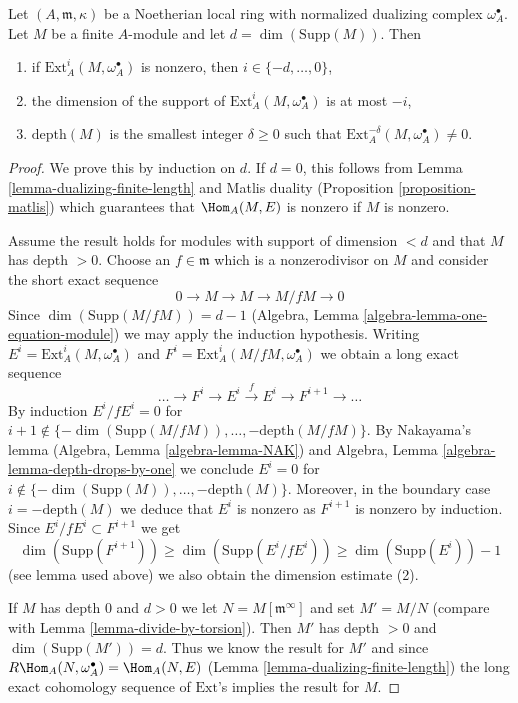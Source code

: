\begin{lemma}
\label{lemma-sitting-in-degrees}
Let $(A, \mathfrak m, \kappa)$ be a Noetherian local ring with
normalized dualizing complex $\omega_A^\bullet$. Let $M$ be a finite
$A$-module and let $d = \dim(\text{Supp}(M))$. Then
\begin{enumerate}
\item if $\text{Ext}^i_A(M, \omega_A^\bullet)$ is nonzero, then
$i \in \{-d, \ldots, 0\}$,
\item the dimension of the support of $\text{Ext}^i_A(M, \omega_A^\bullet)$
is at most $-i$,
\item $\text{depth}(M)$ is the smallest integer $\delta \geq 0$ such that
$\text{Ext}^{-\delta}_A(M, \omega_A^\bullet) \not = 0$.
\end{enumerate}
\end{lemma}

\begin{proof}
We prove this by induction on $d$. If $d = 0$, this follows from
Lemma \ref{lemma-dualizing-finite-length} and Matlis duality
(Proposition \ref{proposition-matlis}) which guarantees that
$\Hom_A(M, E)$ is nonzero if $M$ is nonzero.

\medskip\noindent
Assume the result holds for modules with support of dimension $< d$ and that
$M$ has depth $> 0$. Choose an $f \in \mathfrak m$ which is a nonzerodivisor
on $M$ and consider the short exact sequence
$$
0 \to M \to M \to M/fM \to 0
$$
Since $\dim(\text{Supp}(M/fM)) = d - 1$
(Algebra, Lemma \ref{algebra-lemma-one-equation-module}) we
may apply the induction hypothesis.
Writing
$E^i = \text{Ext}^i_A(M, \omega_A^\bullet)$ and
$F^i = \text{Ext}^i_A(M/fM, \omega_A^\bullet)$
we obtain a long exact sequence
$$
\ldots \to F^i \to E^i \xrightarrow{f} E^i \to F^{i + 1} \to \ldots
$$
By induction $E^i/fE^i = 0$ for
$i + 1 \not \in \{-\dim(\text{Supp}(M/fM)), \ldots, -\text{depth}(M/fM)\}$.
By Nakayama's lemma (Algebra, Lemma \ref{algebra-lemma-NAK})
and Algebra, Lemma \ref{algebra-lemma-depth-drops-by-one}
we conclude $E^i = 0$ for
$i \not \in \{-\dim(\text{Supp}(M)), \ldots, -\text{depth}(M)\}$.
Moreover, in the boundary case $i = - \text{depth}(M)$ we deduce that $E^i$
is nonzero as $F^{i + 1}$ is nonzero by induction.
Since $E^i/fE^i \subset F^{i + 1}$ we get
$$
\dim(\text{Supp}(F^{i + 1})) \geq \dim(\text{Supp}(E^i/fE^i))
\geq \dim(\text{Supp}(E^i)) - 1
$$
(see lemma used above) we also obtain the dimension estimate (2).

\medskip\noindent
If $M$ has depth $0$ and $d > 0$ we let $N = M[\mathfrak m^\infty]$ and set
$M' = M/N$ (compare with Lemma \ref{lemma-divide-by-torsion}).
Then $M'$ has depth $>0$ and $\dim(\text{Supp}(M')) = d$.
Thus we know the result for $M'$ and since
$R\Hom_A(N, \omega_A^\bullet) = \Hom_A(N, E)$
(Lemma \ref{lemma-dualizing-finite-length})
the long exact cohomology sequence of $\text{Ext}$'s implies the
result for $M$.
\end{proof}

